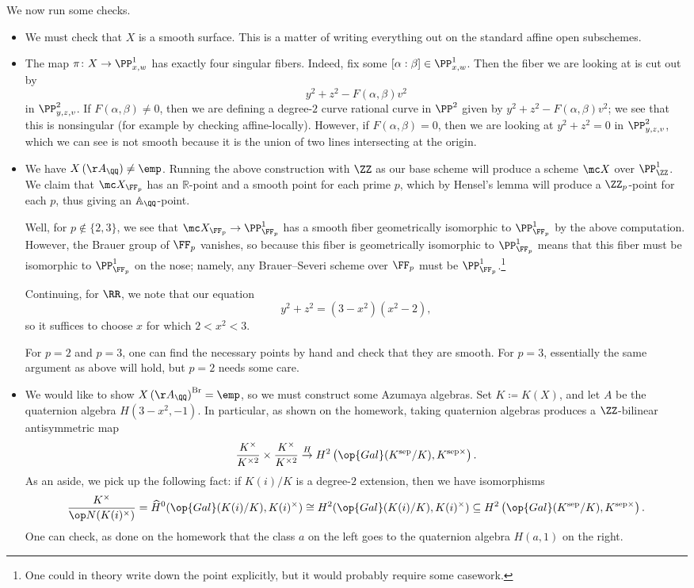 \documentclass[../notes.tex]{subfiles}
\begin{document}
We now run some checks.
\begin{itemize}
	\item We must check that $X$ is a smooth surface. This is a matter of writing everything out on the standard affine open subschemes.
	\item The map $\pi\colon X\to\PP^1_{x,w}$ has exactly four singular fibers. Indeed, fix some $[\alpha:\beta]\in\PP^1_{x,w}$. Then the fiber we are looking at is cut out by
	\[y^2+z^2-F(\alpha,\beta)v^2\]
	in $\PP^2_{y,z,v}$. If $F(\alpha,\beta)\ne0$, then we are defining a degree-$2$ curve rational curve in $\PP^2$ given by $y^2+z^2-F(\alpha,\beta)v^2$; we see that this is nonsingular (for example by checking affine-locally). However, if $F(\alpha,\beta)=0$, then we are looking at $y^2+z^2=0$ in $\PP^2_{y,z,v}$, which we can see is not smooth because it is the union of two lines intersecting at the origin.
	\item We have $X\left(\AA_\QQ\right)\ne\emp$. Running the above construction with $\ZZ$ as our base scheme will produce a scheme $\mc X$ over $\PP^1_\ZZ$. We claim that $\mc X_{\FF_p}$ has an $\mathbb R$-point and a smooth point for each prime $p$, which by Hensel's lemma will produce a $\ZZ_p$-point for each $p$, thus giving an $\mathbb A_\QQ$-point.

	Well, for $p\notin\{2,3\}$, we see that $\mc X_{\FF_p}\to\PP^1_{\FF_p}$ has a smooth fiber geometrically isomorphic to $\PP^1_{\FF_p}$ by the above computation. However, the Brauer group of $\FF_p$ vanishes, so because this fiber is geometrically isomorphic to $\PP^1_{\FF_p}$ means that this fiber must be isomorphic to $\PP^1_{\FF_p}$ on the nose; namely, any Brauer--Severi scheme over $\FF_p$ must be $\PP^1_{\FF_p}$.\footnote{One could in theory write down the point explicitly, but it would probably require some casework.}

	Continuing, for $\RR$, we note that our equation
	\[y^2+z^2=\left(3-x^2\right)\left(x^2-2\right),\]
	so it suffices to choose $x$ for which $2<x^2<3$.

	For $p=2$ and $p=3$, one can find the necessary points by hand and check that they are smooth. For $p=3$, essentially the same argument as above will hold, but $p=2$ needs some care.

	\item We would like to show $X\left(\AA_\QQ\right)^{\mathrm{Br}}=\emp$, so we must construct some Azumaya algebras. Set $K\coloneqq K(X)$, and let $A$ be the quaternion algebra $H\left(3-x^2,-1\right)$. In particular, as shown on the homework, taking quaternion algebras produces a $\ZZ$-bilinear antisymmetric map
	\[\frac{K^\times}{K^{\times2}}\times\frac{K^\times}{K^{\times2}}\stackrel H\to H^2\left(\op{Gal}(K^{\mathrm{sep}}/K),K^{\mathrm{sep}\times}\right).\]
	As an aside, we pick up the following fact: if $K(i)/K$ is a degree-$2$ extension, then we have isomorphisms
	\[\frac{K^\times}{\op N(K(i)^\times)}=\widehat H^0(\op{Gal}(K(i)/K),K(i)^\times)\cong H^2(\op{Gal}(K(i)/K),K(i)^\times)\subseteq H^2\left(\op{Gal}(K^{\mathrm{sep}}/K),K^{\mathrm{sep}\times}\right).\]
	One can check, as done on the homework that the class $a$ on the left goes to the quaternion algebra $H(a,1)$ on the right.


\end{itemize}
\end{document}
